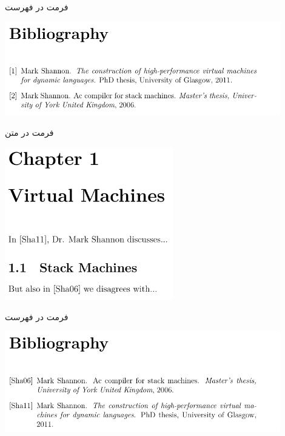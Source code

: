 \begin{frame}{فرمت  در فهرست}
\begin{center}
\includegraphics[width=0.9\textwidth, height=0.5\textheight]{docs/images/unsrt-2}
\end{center}
\end{frame}

\begin{frame}{فرمت  در متن}
\begin{center}
\includegraphics[width=0.55\textwidth, height=0.7\textheight]{docs/images/alpha-1}
\end{center}
\end{frame}

\begin{frame}{فرمت  در فهرست}
\begin{center}
\includegraphics[width=0.9\textwidth, height=0.5\textheight]{docs/images/alpha-2}
\end{center}
\end{frame}

